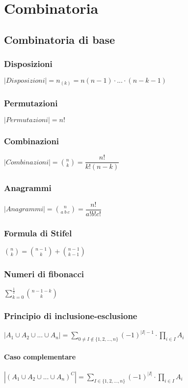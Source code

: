 
\chapter{Combinatoria}

\section{Combinatoria di base}
\subsection{Disposizioni}
$|Disposizioni| = n_{(k)} = n(n - 1) \cdot ... \cdot (n - k - 1)$
\subsection{Permutazioni}
$|Permutazioni| = n!$
\subsection{Combinazioni}
$|Combinazioni| = \binom{n}{k} = \dfrac{n!}{k!(n - k)}$
\subsection{Anagrammi}
$|Anagrammi| = \binom{n}{a \ b \ c} = \dfrac{n!}{a!b!c!}$
\subsection{Formula di Stifel}
$\binom{n}{k} = \binom{n - 1}{k} + \binom{n - 1}{k - 1}$
\subsection{Numeri di fibonacci}
$\sum_{k = 0}^{\tfrac{1}{2}} \binom{n - 1 -k}{k}$
\subsection{Principio di inclusione-esclusione}
$|A_1 \cup A_2 \cup ... \cup A_n| = \sum_{0 \neq I \not\in \{1, 2, ..., n\}} (-1)^{|I| - 1} \cdot \prod_{i \in I} A_i$ \\ \\
\textbf{Caso complementare} \\ \\
$|(A_1 \cup A_2 \cup ... \cup A_n)^C| = \sum_{I \in \{1, 2, ..., n\}} (-1)^|I| \cdot \prod_{i \in I} A_i$
